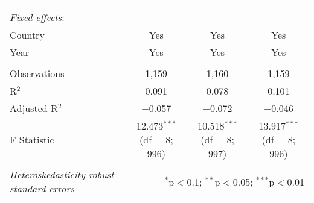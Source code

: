 \documentclass[a4paper, 12pt]{article}
\begin{document}
\begin{table}[!htbp]
{\begin{tabular}{@{\extracolsep{5pt}}lccc}
  & & & \\ 
      \hline \\[-1.8ex] 
 \textit{Fixed effects}:\\
Country & Yes & Yes & Yes\\
Year & Yes & Yes & Yes \\
\hline \\[-1.8ex] 
Observations & 1,159 & 1,160 & 1,159 \\ 
R$^{2}$ & 0.091 & 0.078 & 0.101 \\ 
Adjusted R$^{2}$ & $-$0.057 & $-$0.072 & $-$0.046 \\ 
F Statistic & 12.473$^{***}$ (df = 8; 996) & 10.518$^{***}$ (df = 8; 997) & 13.917$^{***}$ (df = 8; 996) \\ 
\hline 
\hline \\[-1.8ex] 
\footnotesize{\textit{Heteroskedasticity-robust standard-errors}} & \multicolumn{3}{r}{$^{*}$p$<$0.1; $^{**}$p$<$0.05; $^{***}$p$<$0.01} \\ 
\end{tabular} 
}
\end{table} 
	
	
	
	
	
	\newpage
	\printbibliography

    
\end{document}
